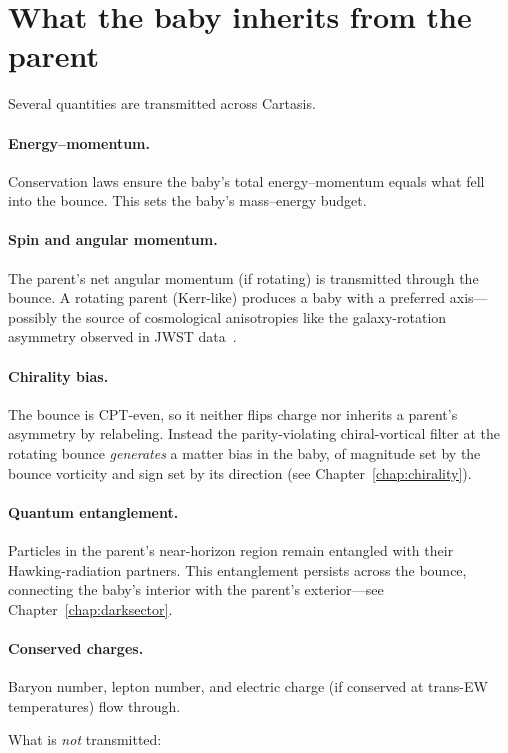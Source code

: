 \section{What the baby inherits from the parent}

Several quantities are transmitted across Cartasis.

\paragraph{Energy--momentum.} Conservation laws ensure the baby's total
energy--momentum equals what fell into the bounce. This sets the baby's
mass--energy budget.

\paragraph{Spin and angular momentum.} The parent's net angular momentum (if
rotating) is transmitted through the bounce. A rotating parent (Kerr-like)
produces a baby with a preferred axis---possibly the source of cosmological
anisotropies like the galaxy-rotation asymmetry observed in JWST
data~\citep{shamir2025}.

\paragraph{Chirality bias.} The bounce is CPT-even, so it neither flips charge
nor inherits a parent's asymmetry by relabeling. Instead the parity-violating
chiral-vortical filter at the rotating bounce \emph{generates} a matter bias in
the baby, of magnitude set by the bounce vorticity and sign set by its direction
(see Chapter~\ref{chap:chirality}).

\paragraph{Quantum entanglement.} Particles in the parent's near-horizon region
remain entangled with their Hawking-radiation partners. This entanglement
persists across the bounce, connecting the baby's interior with the parent's
exterior---see Chapter~\ref{chap:darksector}.

\paragraph{Conserved charges.} Baryon number, lepton number, and electric charge
(if conserved at trans-EW temperatures) flow through.

\medskip
\noindent What is \emph{not} transmitted:

